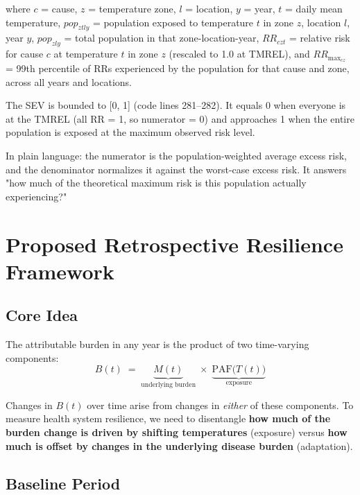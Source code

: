 \documentclass[11pt,a4paper]{article}
\begin{document}
  where $c$ = cause, $z$ = temperature zone, $l$ = location, $y$ = year, $t$ = daily mean temperature,  $pop_{ztly}$ = population exposed to temperature $t$ in zone $z$, location $l$, year $y$, $pop_{zly}$ = total population in that zone-location-year, $RR_{czt}$ = relative risk for cause $c$ at temperature $t$ in zone $z$ (rescaled to 1.0 at TMREL), and  $RR_{\max_{cz}}$ = 99th percentile of RRs experienced by the population for that cause and zone, across  all years and locations.

  The SEV is bounded to [0, 1] (code lines 281–282). It equals 0 when everyone is at the TMREL (all RR = 1,
   so numerator = 0) and approaches 1 when the entire population is exposed at the maximum observed risk
  level.

  In plain language: the numerator is the population-weighted average excess risk, and the denominator
  normalizes it against the worst-case excess risk. It answers "how much of the theoretical maximum risk is
   this population actually experiencing?"


\section{Proposed Retrospective Resilience Framework}

\subsection{Core Idea}

The attributable burden in any year is the product of two time-varying components:
\begin{equation}
  B(t) \;=\; \underbrace{M(t)}_{\text{underlying burden}} \;\times\; \underbrace{\text{PAF}\bigl(T(t)\bigr)}_{\text{exposure}}
  \label{eq:decomp}
\end{equation}

Changes in $B(t)$ over time arise from changes in \emph{either} of these components. To measure health system resilience, we need to disentangle \textbf{how much of the burden change is driven by shifting temperatures} (exposure) versus \textbf{how much is offset by changes in the underlying disease burden} (adaptation).

\subsection{Baseline Period}
\end{document}

